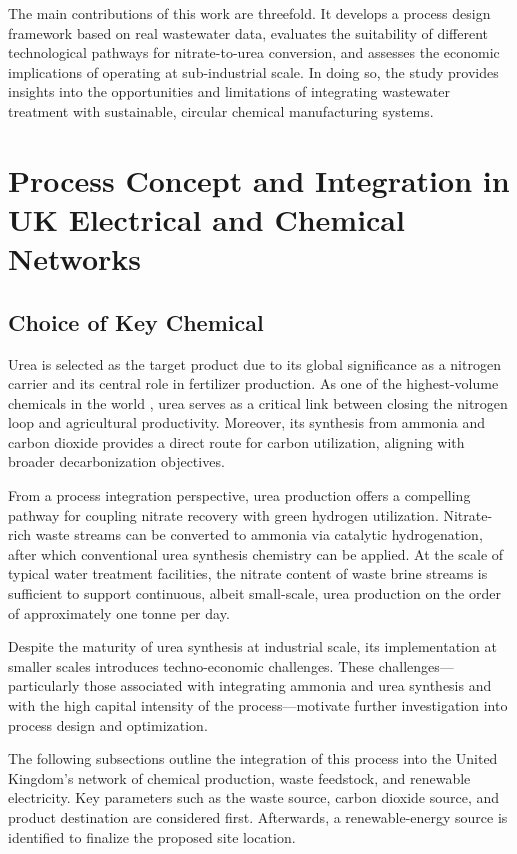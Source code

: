 \documentclass[letterpaper]{article}
\begin{document}
The main contributions of this work are threefold. It develops a
process design framework based on real wastewater data, evaluates the
suitability of different technological pathways for nitrate-to-urea
conversion, and assesses the economic implications of operating at
sub-industrial scale. In doing so, the study provides insights into
the opportunities and limitations of integrating wastewater treatment
with sustainable, circular chemical manufacturing systems.

\section{Process Concept and Integration in UK Electrical and
  Chemical Networks}

\subsection{Choice of Key Chemical}

Urea is selected as the target product due to its global significance
as a nitrogen carrier and its central role in fertilizer
production. As one of the highest-volume chemicals in the world
\cite{IFASTAT_UreaAtAGlance}, urea serves as a critical link between
closing the nitrogen loop and agricultural productivity. Moreover,
its synthesis from ammonia and carbon dioxide provides a direct route
for carbon utilization, aligning with broader decarbonization
objectives.

From a process integration perspective, urea production offers a
compelling pathway for coupling nitrate recovery with green hydrogen
utilization. Nitrate-rich waste streams can be converted to ammonia
via catalytic hydrogenation, after which conventional urea synthesis
chemistry can be applied. At the scale of typical water treatment
facilities, the nitrate content of waste brine streams is sufficient
to support continuous, albeit small-scale, urea production on the
order of approximately one tonne per day.

Despite the maturity of urea synthesis at industrial scale, its
implementation at smaller scales introduces techno-economic
challenges. These challenges---particularly those associated with
integrating ammonia and urea synthesis and with the high capital
intensity of the process---motivate further investigation into
process design and optimization.

The following subsections outline the integration of this process
into the United Kingdom's network of chemical production, waste
feedstock, and renewable electricity. Key parameters such as the
waste source, carbon dioxide source, and product destination are
considered first. Afterwards, a renewable-energy source is identified
to finalize the proposed site location.
\end{document}
